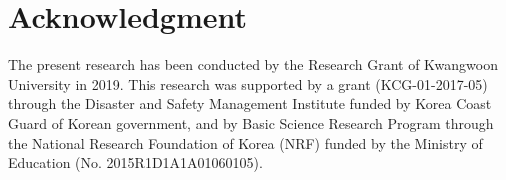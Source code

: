 \section*{Acknowledgment}
The present research has been conducted by the Research Grant of Kwangwoon University in 2019.
This research was supported by a grant (KCG-01-2017-05) through the Disaster and Safety Management Institute funded by Korea Coast Guard of Korean government, and by Basic Science Research Program through the National Research Foundation of Korea (NRF) funded by the Ministry of Education (No. 2015R1D1A1A01060105).

